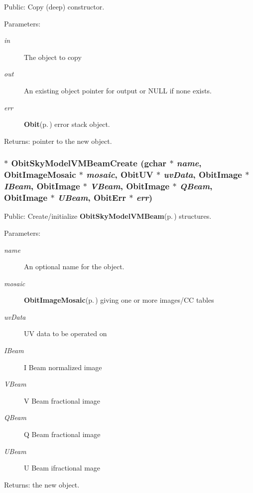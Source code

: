 Public: Copy (deep) constructor. 

\begin{Desc}
\item[Parameters:]
\begin{description}
\item[{\em in}]The object to copy \item[{\em out}]An existing object pointer for output or NULL if none exists. \item[{\em err}]{\bf Obit}{\rm (p.\,\pageref{structObit})} error stack object. \end{description}
\end{Desc}
\begin{Desc}
\item[Returns:]pointer to the new object. \end{Desc}
\subsubsection{$\ast$ Obit\-Sky\-Model\-VMBeam\-Create (gchar $\ast$ {\em name}, {\bf Obit\-Image\-Mosaic} $\ast$ {\em mosaic}, {\bf Obit\-UV} $\ast$ {\em uv\-Data}, {\bf Obit\-Image} $\ast$ {\em IBeam}, {\bf Obit\-Image} $\ast$ {\em VBeam}, {\bf Obit\-Image} $\ast$ {\em QBeam}, {\bf Obit\-Image} $\ast$ {\em UBeam}, {\bf Obit\-Err} $\ast$ {\em err})}\label{ObitSkyModelVMBeam_8h_a6}


Public: Create/initialize {\bf Obit\-Sky\-Model\-VMBeam}{\rm (p.\,\pageref{structObitSkyModelVMBeam})} structures. 

\begin{Desc}
\item[Parameters:]
\begin{description}
\item[{\em name}]An optional name for the object. \item[{\em mosaic}]{\bf Obit\-Image\-Mosaic}{\rm (p.\,\pageref{structObitImageMosaic})} giving one or more images/CC tables \item[{\em uv\-Data}]UV data to be operated on \item[{\em IBeam}]I Beam normalized image \item[{\em VBeam}]V Beam fractional image \item[{\em QBeam}]Q Beam fractional image \item[{\em UBeam}]U Beam ifractional mage \end{description}
\end{Desc}
\begin{Desc}
\item[Returns:]the new object. \end{Desc}
